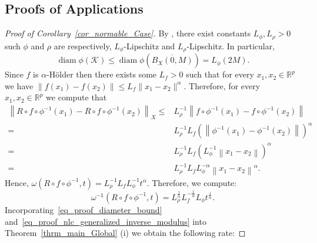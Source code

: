 \documentclass[anon,12pt]{colt2021} %
\newcommand{\rr}{{\mathbb{R}}}
\newcommand{\rrflex}[1]{{\ensuremath{\rr^{#1}
}}}
\newcommand{\rrp}{{\rrflex{p}}}
\newcommand{\kkk}{{\mathscr{K}}}
\begin{document}
\subsection{Proofs of Applications}
\begin{proof}[{Proof of Corollary~\ref{cor_normable_Case}}]
By \citep[Theorem 3.1]{conway2013course}, there exist constants $L_{\phi},L_{\rho}>0$ such $\phi$ and $\rho$ are respectively, $L_{\phi}$-Lipschitz and $L_{\rho}$-Lipschitz.  In particular,
\begin{equation}
    \operatorname{diam} \phi(\kkk) \leq \operatorname{diam}\phi(\overline{B_X(0,M)}) = L_{\phi} (2M)
    \label{eq_proof_diameter_bound}
    .
\end{equation}
Since $f$ is $\alpha$-H\"{o}lder then there exists some $L_f>0$ such that for every $x_1,x_2 \in \rrp$ we have $\|f(x_1)-f(x_2)\|\leq L_f \|x_1-x_2\|^{\alpha}$.  Therefore, for every $x_1,x_2 \in \rrp$ we compute that
\begin{equation}
\begin{aligned}
    \left\|
    R\circ f\circ  \phi^{-1} (x_1) 
        - 
    R\circ f\circ  \phi^{-1} (x_2) 
    \right\|_X
        \leq &
    L_{\rho}^{-1}
    \left\|
    f\circ  \phi^{-1} (x_1) 
        - 
    f\circ  \phi^{-1} (x_2) 
    \right\|
    \\
    = &
    L_{\rho}^{-1}
    L_f
    \left(
    \left\|
    \phi^{-1} (x_1) 
        - 
    \phi^{-1} (x_2) 
    \right\|
    \right)^{\alpha}
    \\
    = &
    L_{\rho}^{-1}
    L_f
    \left(
    L_{\phi}^{-1}
    \left\|
    x_1
        - 
    x_2
    \right\|
    \right)^{\alpha}
    \\
    = & 
    L_{\rho}^{-1}
    L_f
    L_{\phi}^{-\alpha}
    \left\|
    x_1
        - 
    x_2
    \right\|^{\alpha}
    \label{eq_holder_continuity_of_composition}
    .
    \end{aligned}
\end{equation}
Hence, $\omega\left(
R\circ f\circ  \phi^{-1}
,t
\right)
= 
L_{\rho}^{-1}
L_f
L_{\phi}^{-1}t^{\alpha}
.
$
Therefore, we compute:
\begin{equation}
    \omega^{-1}
    \left(
R\circ f\circ  \phi^{-1}
,t
\right)
= 
L_{\rho}^{\frac1{\alpha}} L_f^{-\frac1{\alpha}}L_{\phi}
t^{\frac1{\alpha}}
    \label{eq_proof_nlc_generalized_inverse_modulus}
    .
\end{equation}
Incorporating~\eqref{eq_proof_diameter_bound} and~\eqref{eq_proof_nlc_generalized_inverse_modulus} into Theorem~\ref{thrm_main_Global} (i) we obtain the following rate:

\end{proof}
\end{document}
